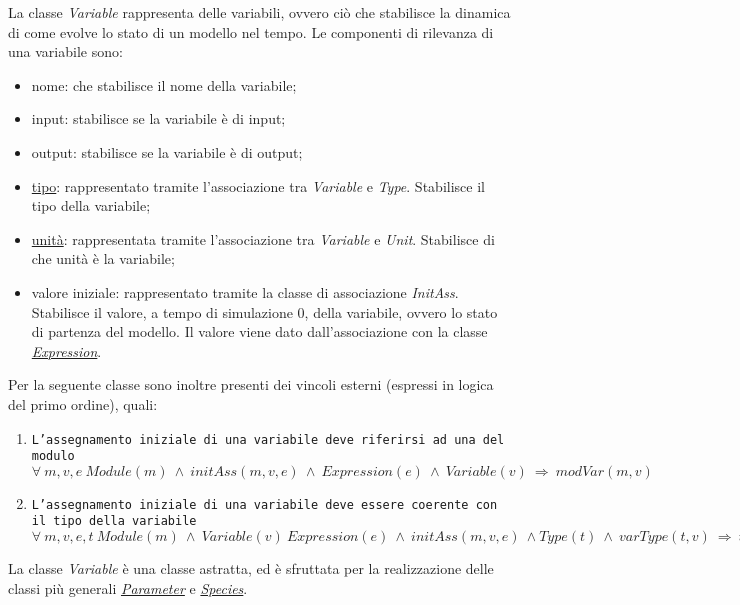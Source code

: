 
La classe \textit{Variable} rappresenta delle variabili, ovvero ciò che stabilisce la dinamica di come evolve lo stato di un modello nel tempo. Le componenti di rilevanza di una variabile sono:
\begin{itemize}
	\item nome: che stabilisce il nome della variabile;
	\item input: stabilisce se la variabile è di input;
	\item output: stabilisce se la variabile è di output;
	\item \hyperref[sec:modelstranslator:analysis:model_analysis:type]{tipo}: rappresentato tramite l'associazione tra \textit{Variable} e \textit{Type}. Stabilisce il tipo della variabile;
	\item \hyperref[sec:modelstranslator:analysis:model_analysis:unit]{unità}: rappresentata tramite l'associazione tra \textit{Variable} e \textit{Unit}. Stabilisce di che unità è la variabile;
	\item valore iniziale: rappresentato tramite la classe di associazione \textit{InitAss}. Stabilisce il valore, a tempo di simulazione $0$, della variabile, ovvero lo stato di partenza del modello. Il valore viene dato dall'associazione con la classe \hyperref[sec:modelstranslator:analysis:model_analysis:expression]{\textit{Expression}}.
\end{itemize}
Per la seguente classe sono inoltre presenti dei vincoli esterni (espressi in logica del primo ordine), quali:
\begin{enumerate}
	\item \texttt{L'assegnamento iniziale di una variabile deve riferirsi ad una del modulo} \\
		  $\forall \ m,v,e \ Module(m) \ \land \ initAss(m, v, e) \ \land \ Expression(e) \ \land \ Variable(v) \ \Rightarrow \ modVar(m, v)$ \\
	\item \texttt{L'assegnamento iniziale di una variabile deve essere coerente con il tipo della variabile} \\
		  $\forall \ m,v,e,t \ Module(m) \ \land \ Variable(v) \ Expression(e) \ \land \ initAss(m, v, e) \ \land Type(t) \ \land \ varType(t, v) \ \Rightarrow \ typeExpr(t, e)$ \\
\end{enumerate}

La classe \textit{Variable} è una classe astratta, ed è sfruttata per la realizzazione delle classi più generali \hyperref[sec:modelstranslator:analysis:model_analysis:variable:parameter]{\textit{Parameter}} e \hyperref[sec:modelstranslator:analysis:model_analysis:variable:species]{\textit{Species}}.

